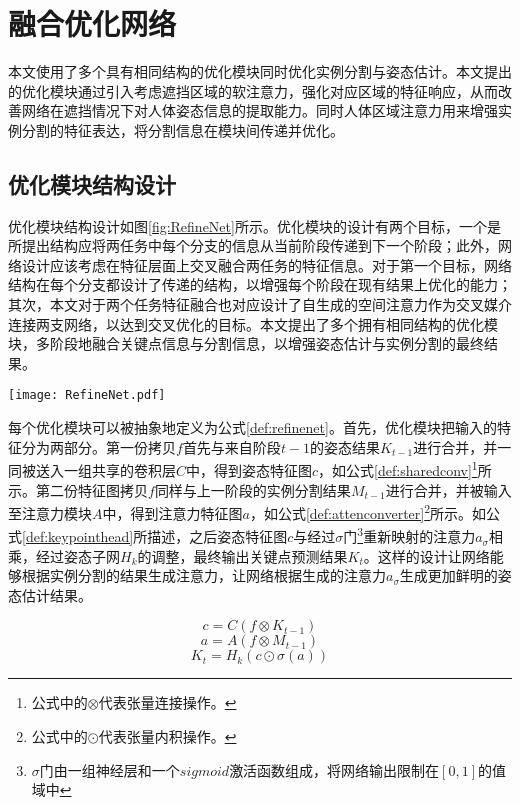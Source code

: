 \section{融合优化网络}
\label{sec:refine}
本文使用了多个具有相同结构的优化模块同时优化实例分割与姿态估计。本文提出的优化模块通过引入考虑遮挡区域的软注意力，强化对应区域的特征响应，从而改善网络在遮挡情况下对人体姿态信息的提取能力。同时人体区域注意力用来增强实例分割的特征表达，将分割信息在模块间传递并优化。

\subsection{优化模块结构设计}
\label{subsec:architecture}

优化模块结构设计如图\ref{fig:RefineNet}所示。优化模块的设计有两个目标，一个是所提出结构应将两任务中每个分支的信息从当前阶段传递到下一个阶段；此外，网络设计应该考虑在特征层面上交叉融合两任务的特征信息。对于第一个目标，网络结构在每个分支都设计了传递的结构，以增强每个阶段在现有结果上优化的能力；其次，本文对于两个任务特征融合也对应设计了自生成的空间注意力作为交叉媒介连接两支网络，以达到交叉优化的目标。本文提出了多个拥有相同结构的优化模块，多阶段地融合关键点信息与分割信息，以增强姿态估计与实例分割的最终结果。

\begin{figure*}[h]	
	\centering
	\texttt{[image: RefineNet.pdf]}
	\caption{融合优化网络具体设计}
	\label{fig:RefineNet}
\end{figure*}

每个优化模块可以被抽象地定义为公式\eqref{def:refinenet}。首先，优化模块把输入的特征分为两部分。第一份拷贝$f$首先与来自阶段$t-1$的姿态结果$K_{t-1}$进行合并，并一同被送入一组共享的卷积层$C$中，得到姿态特征图$c$，如公式\eqref{def:sharedconv}\footnote{公式中的$\otimes$代表张量连接操作。}所示。第二份特征图拷贝$f$同样与上一阶段的实例分割结果$M_{t-1}$进行合并，并被输入至注意力模块$A$中，得到注意力特征图$a$，如公式\eqref{def:attenconverter}\footnote{公式中的$\odot$代表张量内积操作。}所示。如公式\eqref{def:keypointhead}所描述，之后姿态特征图$c$与经过$\sigma$门\footnote{$\sigma$门由一组神经层和一个$sigmoid$激活函数组成，将网络输出限制在$[0,1]$的值域中}重新映射的注意力$a_{\sigma}$相乘，经过姿态子网$H_k$的调整，最终输出关键点预测结果$K_t$。这样的设计让网络能够根据实例分割的结果生成注意力，让网络根据生成的注意力$a_{\sigma}$生成更加鲜明的姿态估计结果。

\begin{equation}
\label{def:sharedconv}
c = C(f\otimes{K_{t-1}})
\end{equation}
\begin{equation}
\label{def:attenconverter}
a = A(f\otimes{M_{t-1}})
\end{equation}
\begin{equation}
\label{def:keypointhead}
K_t = H_k(c\odot \sigma(a))
\end{equation}

